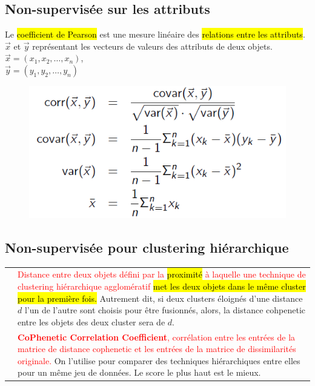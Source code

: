 \documentclass[letterpaper, 12pt]{article}
\newcommand{\red}[1]{
	\textcolor{red}{#1}}
\newcommand{\myul}[1]{
		\underline{\smash{#1}}
	}
\begin{document}
		\subsection{Non-supervisée sur les attributs}
			\begin{minipage}{0.4\textwidth}
				Le \hl{coefficient de Pearson} est une mesure
					linéaire des \hl{relations entre les attributs}.
				$\overrightarrow{x}$ et $\overrightarrow{y}$ représentant
					les vecteurs de valeurs des attributs de deux 
					objets.\\
				$\overrightarrow{x} = (x_1, x_2, \ldots, x_n)$, \\
				$\overrightarrow{y} = (y_1, y_2, \ldots, y_n)$
			\end{minipage}\hfill
			\begin{minipage}{0.55\textwidth}
				\begin{figure}[H]
					\centering
					\includegraphics[scale=0.6]{Images/pearson.png}
				\end{figure}\noindent
			\end{minipage}
		\vspace*{-0.5cm}
		\subsection{Non-supervisée pour clustering hiérarchique}
			\begin{tabular}{lp{13cm}}
				\myul{\textbf{\hl{Cophenetic distance}}} &
					\red{Distance entre deux objets défini par la 
						 \hl{proximité} à laquelle une technique de 
						 clustering hiérarchique agglomératif
						 \hl{met les deux objets dans le même cluster
						 pour la première fois.}} Autrement dit, 
						 si deux clusters éloignés d'une distance
						 $d$ l'un de l'autre sont choisis pour
						 être fusionnés, alors, la distance cohpenetic
						 entre les objets des deux cluster sera de $d$.\\
				\myul{\textbf{\hl{CPCC}}} &
					\red{\textbf{CoPhenetic Correlation Coefficient}, 
						corrélation entre les entrées de la matrice de
						 distance cophenetic et les entrées de la 
						 matrice de dissimilarités originale.} On l'utilise
						 pour comparer des techniques hiérarchiques
						 entre elles pour un même jeu de données. Le score
						 le plus haut est le mieux.
			\end{tabular}
		\vspace*{-0.5cm}
\end{document}
